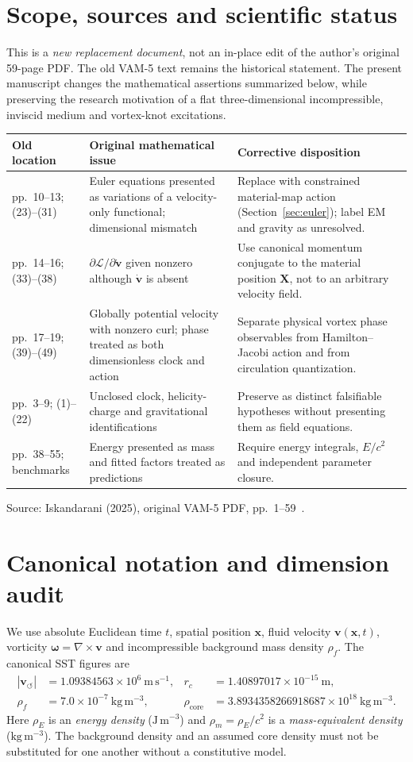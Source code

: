\documentclass[11pt,a4paper]{article}
\newcommand{\rhoF}{\rho_{\!f}}
\newcommand{\rhoE}{\rho_{\!E}}
\newcommand{\rhoM}{\rho_{\!m}}
\newcommand{\rc}{r_c}
\newcommand{\vswirl}{\mathbf{v}_{\!\boldsymbol{\circlearrowleft}}}
\newcommand{\om}{\boldsymbol{\omega}}
\newcommand{\vv}{\mathbf v}
\newcommand{\XX}{\mathbf X}
\begin{document}
\section{Scope, sources and scientific status}
This is a \emph{new replacement document}, not an in-place edit of the author's original 59-page PDF. The old VAM-5 text remains the historical statement. The present manuscript changes the mathematical assertions summarized below, while preserving the research motivation of a flat three-dimensional incompressible, inviscid medium and vortex-knot excitations.
\begin{center}\small
\begin{tabular}{p{26mm}p{50mm}p{67mm}}\toprule
Old location & Original mathematical issue & Corrective disposition \\ \midrule
pp.~10--13; (23)--(31) & Euler equations presented as variations of a velocity-only functional; dimensional mismatch & Replace with constrained material-map action (Section~\ref{sec:euler}); label EM and gravity as unresolved.\\
pp.~14--16; (33)--(38) & $\partial\mathcal L/\partial\dot{\vv}$ given nonzero although $\dot{\vv}$ is absent & Use canonical momentum conjugate to the material position $\XX$, not to an arbitrary velocity field.\\
pp.~17--19; (39)--(49) & Globally potential velocity with nonzero curl; phase treated as both dimensionless clock and action & Separate physical vortex phase observables from Hamilton--Jacobi action and from circulation quantization.\\
pp.~3--9; (1)--(22) & Unclosed clock, helicity-charge and gravitational identifications & Preserve as distinct falsifiable hypotheses without presenting them as field equations.\\
pp.~38--55; benchmarks & Energy presented as mass and fitted factors treated as predictions & Require energy integrals, $E/c^2$ and independent parameter closure.\\ \bottomrule
\end{tabular}
\end{center}
Source: Iskandarani (2025), original VAM-5 PDF, pp.~1--59~\cite{VAM5}.

\section{Canonical notation and dimension audit}
We use absolute Euclidean time $t$, spatial position $\mathbf x$, fluid velocity $\vv(\mathbf x,t)$, vorticity $\om=\nabla\times\vv$ and incompressible background mass density $\rhoF$. The canonical SST figures are
\begin{align}
|\vswirl|&=1.09384563\times10^{6}\ \mathrm{m\,s^{-1}},&\rc&=1.40897017\times10^{-15}\ \mathrm m,\\
\rhoF&=7.0\times10^{-7}\ \mathrm{kg\,m^{-3}},&\rho_{\mathrm{core}}&=3.8934358266918687\times10^{18}\ \mathrm{kg\,m^{-3}}.
\end{align}
Here $\rhoE$ is an \emph{energy density} ($\mathrm{J\,m^{-3}}$) and $\rhoM=\rhoE/c^2$ is a \emph{mass-equivalent density} ($\mathrm{kg\,m^{-3}}$). The background density and an assumed core density must not be substituted for one another without a constitutive model.
\end{document}
